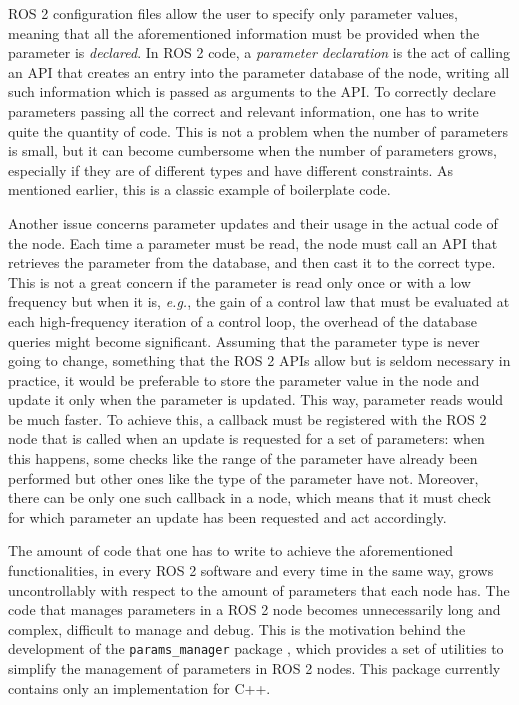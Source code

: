 ROS 2 configuration files allow the user to specify only parameter values, meaning that all the aforementioned information must be provided when the parameter is \emph{declared}. In ROS 2 code, a \emph{parameter declaration} is the act of calling an API that creates an entry into the parameter database of the node, writing all such information which is passed as arguments to the API. To correctly declare parameters passing all the correct and relevant information, one has to write quite the quantity of code. This is not a problem when the number of parameters is small, but it can become cumbersome when the number of parameters grows, especially if they are of different types and have different constraints. As mentioned earlier, this is a classic example of boilerplate code.

Another issue concerns parameter updates and their usage in the actual code of the node. Each time a parameter must be read, the node must call an API that retrieves the parameter from the database, and then cast it to the correct type. This is not a great concern if the parameter is read only once or with a low frequency but when it is, \emph{e.g.}, the gain of a control law that must be evaluated at each high-frequency iteration of a control loop, the overhead of the database queries might become significant. Assuming that the parameter type is never going to change, something that the ROS 2 APIs allow but is seldom necessary in practice, it would be preferable to store the parameter value in the node and update it only when the parameter is updated. This way, parameter reads would be much faster. To achieve this, a callback must be registered with the ROS 2 node that is called when an update is requested for a set of parameters: when this happens, some checks like the range of the parameter have already been performed but other ones like the type of the parameter have not. Moreover, there can be only one such callback in a node, which means that it must check for which parameter an update has been requested and act accordingly.

The amount of code that one has to write to achieve the aforementioned functionalities, in every ROS 2 software and every time in the same way, grows uncontrollably with respect to the amount of parameters that each node has. The code that manages parameters in a ROS 2 node becomes unnecessarily long and complex, difficult to manage and debug. This is the motivation behind the development of the \texttt{params\_manager} package \cite{masocco_params_manager_nodate}, which provides a set of utilities to simplify the management of parameters in ROS 2 nodes. This package currently contains only an implementation for C++.


